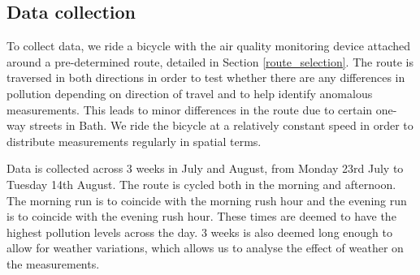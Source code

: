 \documentclass[11pt]{report}
\begin{document}




%

\subsection{Data collection}

To collect data, we ride a bicycle with the air quality monitoring device attached around a pre-determined route, detailed in Section \ref{route_selection}. The route is traversed in both directions in order to test whether there are any differences in pollution depending on direction of travel and to help identify anomalous measurements. This leads to minor differences in the route due to certain one-way streets in Bath. We ride the bicycle at a relatively constant speed in order to distribute measurements regularly in spatial terms.

Data is collected across 3 weeks in July and August, from Monday 23rd July to Tuesday 14th August. The route is cycled both in the morning and afternoon. The morning run is to coincide with the morning rush hour and the evening run is to coincide with the evening rush hour. These times are deemed to have the highest pollution levels across the day. 3 weeks is also deemed long enough to allow for weather variations, which allows us to analyse the effect of weather on the measurements.
\end{document}
